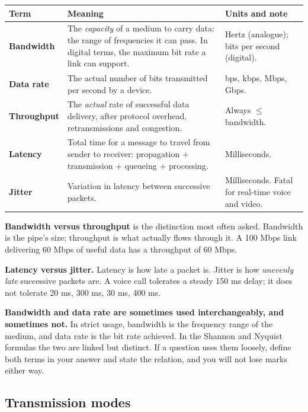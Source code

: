 \documentclass[11pt,a4paper]{article}
\begin{document}
\begin{solbox}
\begin{center}\small
\begin{tabularx}{\textwidth}{>{\bfseries}p{} X p{}}
\toprule Term & Meaning & Units and note\\
\midrule
Bandwidth & The \emph{capacity} of a medium to carry data: the range of frequencies it can pass. In digital terms, the maximum bit rate a link can support. & Hertz (analogue); bits per second (digital).\\
Data rate & The actual number of bits transmitted per second by a device. & bps, kbps, Mbps, Gbps.\\
Throughput & The \emph{actual} rate of successful data delivery, after protocol overhead, retransmissions and congestion. & Always $\le$ bandwidth.\\
Latency & Total time for a message to travel from sender to receiver: propagation $+$ transmission $+$ queueing $+$ processing. & Milliseconds.\\
Jitter & Variation in latency between successive packets. & Milliseconds. Fatal for real-time voice and video.\\
\bottomrule
\end{tabularx}
\end{center}

\textbf{Bandwidth versus throughput} is the distinction most often asked. Bandwidth is the pipe's size; throughput is what actually flows through it. A 100 Mbps link delivering 60 Mbps of useful data has a throughput of 60 Mbps.

\textbf{Latency versus jitter.} Latency is how late a packet is. Jitter is how \emph{unevenly late} successive packets are. A voice call tolerates a steady 150 ms delay; it does not tolerate 20 ms, 300 ms, 30 ms, 400 ms.
\end{solbox}

\begin{dangerbox}
\textbf{Bandwidth and data rate are sometimes used interchangeably, and sometimes not.} In strict usage, bandwidth is the frequency range of the medium, and data rate is the bit rate achieved. In the Shannon and Nyquist formulas the two are linked but distinct. If a question uses them loosely, define both terms in your answer and state the relation, and you will not lose marks either way.
\end{dangerbox}

\subsection{Transmission modes}
\end{document}
